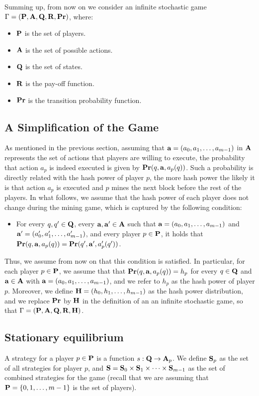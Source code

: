 Summing up, from now on we consider an infinite stochastic game $\Gamma = (\mathbf{P},\mathbf{A},\mathbf{Q},\mathbf{R},\mathbf{Pr})$, where:
\begin{itemize}
	\item $\mathbf{P}$ is the set of players.
	\item $\mathbf{A}$ is the set of possible actions.
	\item $\mathbf{Q}$ is the set of states.
	\item $\mathbf{R}$ is the pay-off function.
	\item $\mathbf{Pr}$ is the transition probability function.
\end{itemize} 

\subsection{A Simplification of the Game}
\label{sec-simp}
As mentioned in the previous section, assuming that $\mathbf{a} = (a_0, a_1, \ldots, a_{m-1})$ in $\mathbf{A}$ represents the set of actions that players are willing to execute, the probability that action $a_p$ is indeed executed is given by $\mathbf{Pr}(q, \mathbf{a}, a_p(q))$. Such a probability is directly related with the hash power of player $p$, the more hash power the likely it is that action $a_p$ is executed and $p$ mines the next block before the rest of the players. In what follows, we assume that the hash power of each player does not change during the mining game, which is captured by the following condition:
\begin{itemize}
\item For every $q, q' \in \mathbf{Q}$, every $\mathbf{a}, \mathbf{a}' \in \mathbf{A}$ such that $\mathbf{a} = (a_0, a_1, \ldots, a_{m-1})$ and $\mathbf{a}' = (a'_0, a'_1, \ldots, a'_{m-1})$,  and every player $p \in \mathbf{P}$, it holds that $\mathbf{Pr}(q, \mathbf{a}, a_p(q)) = \mathbf{Pr}(q', \mathbf{a}', a'_p(q'))$.
\end{itemize}
Thus, we assume from now on that this condition is satisfied. In particular, for each player $p \in \mathbf{P}$, we assume that that 
$\mathbf{Pr}(q, \mathbf{a}, a_p(q)) = h_p$ for every $q \in \mathbf{Q}$ and $\mathbf{a} \in \mathbf{A}$ with $\mathbf{a} = (a_0, a_1, \ldots, a_{m-1})$, and we refer to $h_p$ as the hash power of player $p$. Moreover, we define $\mathbf{H} = (h_0, h_1, \ldots, h_{m-1})$ as the hash power distribution, and we replace $\mathbf{Pr}$ by $\mathbf{H}$ in the definition of an an infinite stochastic game, so that $\Gamma = (\mathbf{P},\mathbf{A},\mathbf{Q},\mathbf{R},\mathbf{H})$.

\subsection{Stationary equilibrium}
A strategy for a player $p \in \mathbf{P}$ is a function $s : \mathbf{Q} \rightarrow \mathbf{A}_p$. 
We define $\mathbf{S}_p$ as the set of all strategies for player $p$, and $\mathbf{S} = \mathbf{S}_0 \times \mathbf{S}_{1} \times \cdots \times \mathbf{S}_{m-1}$ as the set of combined strategies for the game (recall that we are assuming that $\mathbf{P} = \{0, 1, \ldots, m-1\}$ is the set of players). 

